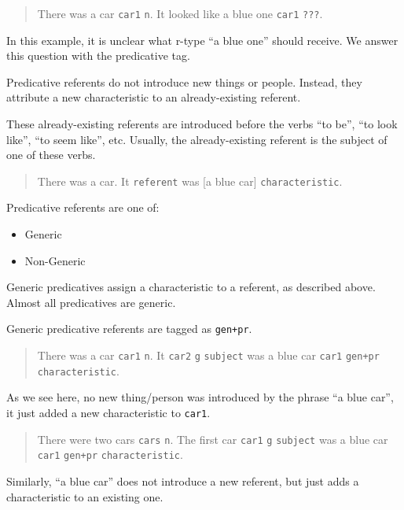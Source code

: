 \documentclass[
]{book}
\providecommand{\tightlist}{%
  \setlength{\itemsep}{0pt}\setlength{\parskip}{0pt}}
\begin{document}
\begin{quote}
There was a car \texttt{car1} \texttt{n}. It looked like a blue one \texttt{car1} \texttt{???}.
\end{quote}

In this example, it is unclear what r-type ``a blue one'' should receive.
We answer this question with the predicative tag.

Predicative referents do not introduce new things or people.
Instead,
they attribute a new characteristic to an already-existing referent.

These already-existing referents are introduced
before the verbs ``to be'', ``to look like'', ``to seem like'', etc.
Usually,
the already-existing referent is the subject of one of these verbs.

\begin{quote}
There was a car.
It \texttt{referent} was {[}a blue car{]} \texttt{characteristic}.
\end{quote}

Predicative referents are one of:

\begin{itemize}
\tightlist
\item
  Generic
\item
  Non-Generic
\end{itemize}

Generic predicatives assign a characteristic to a referent,
as described above.
Almost all predicatives are generic.

Generic predicative referents are tagged as \texttt{gen+pr}.

\begin{quote}
There was a car \texttt{car1} \texttt{n}.
It \texttt{car2} \texttt{g} \texttt{subject} was a blue car \texttt{car1} \texttt{gen+pr} \texttt{characteristic}.
\end{quote}

As we see here, no new thing/person was introduced by the phrase ``a blue car'', it just added a new characteristic to \texttt{car1}.

\begin{quote}
There were two cars \texttt{cars} \texttt{n}.
The first car \texttt{car1} \texttt{g} \texttt{subject} was a blue car \texttt{car1} \texttt{gen+pr} \texttt{characteristic}.
\end{quote}

Similarly, ``a blue car'' does not introduce a new referent, but just adds a characteristic to an existing one.
\end{document}
